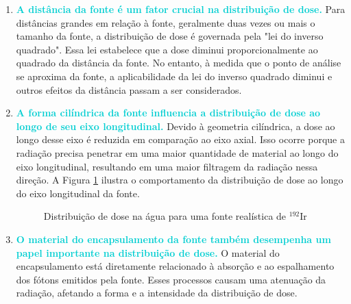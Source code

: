 \documentclass[11pt,a4paper]{article}
\begin{document}
		\begin{enumerate}
			\item \textcolor{DarkTurquoise}{\textbf{A distância da fonte é um fator crucial na distribuição de dose.}} Para distâncias grandes em relação à fonte, geralmente duas vezes ou mais o tamanho da fonte, a distribuição de dose é governada pela "lei do inverso quadrado". Essa lei estabelece que a dose diminui proporcionalmente ao quadrado da distância da fonte. No entanto, à medida que o ponto de análise se aproxima da fonte, a aplicabilidade da lei do inverso quadrado diminui e outros efeitos da distância passam a ser considerados.
			
			\item \textcolor{DarkTurquoise}{\textbf{A forma cilíndrica da fonte influencia a distribuição de dose ao longo de seu eixo longitudinal.}} Devido à geometria cilíndrica, a dose ao longo desse eixo é reduzida em comparação ao eixo axial. Isso ocorre porque a radiação precisa penetrar em uma maior quantidade de material ao longo do eixo longitudinal, resultando em uma maior filtragem da radiação nessa direção. A Figura \ref{img:distribuicaoDeDose} ilustra o comportamento da distribuição de dose ao longo do eixo longitudinal da fonte.
			
				\begin{figure}[h]
					\centering
					\caption{Distribuição de dose na água para uma fonte realística de $\mathrm{{}^{192}Ir}$}
					\label{img:distribuicaoDeDose}
				\end{figure}

			\item \textcolor{DarkTurquoise}{\textbf{O material do encapsulamento da fonte também desempenha um papel importante na distribuição de dose.}} O material do encapsulamento está diretamente relacionado à absorção e ao espalhamento dos fótons emitidos pela fonte. Esses processos causam uma atenuação da radiação, afetando a forma e a intensidade da distribuição de dose.
		\end{enumerate}
	
\end{document}
